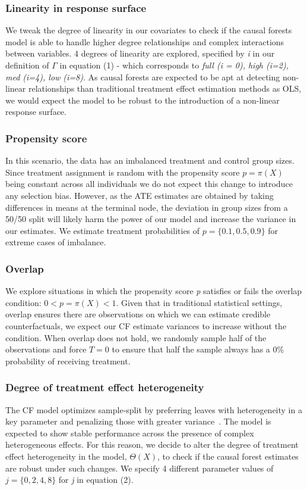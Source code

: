 \documentclass[12pt]{article}
\begin{document}
\subsubsection{Linearity in response surface} 
We tweak the degree of linearity in our covariates to check if the causal
forests model is able to handle higher degree relationships and complex
interactions between variables. 4 degrees of linearity are explored, specified
by \textit{i} in our definition of $\Gamma$ in equation (1) - which corresponds
to \textit{full (i = 0), high (i=2), med (i=4), low (i=8)}. As causal forests
are expected to be apt at detecting non-linear relationships than traditional
treatment effect estimation methods as OLS, we would expect the model to be
robust to the introduction of a non-linear response surface. 

\subsubsection{Propensity score} 
In this scenario, the data has an imbalanced treatment and control group sizes.
Since treatment assignment is random with the propensity score $p = \pi(X)$
being constant across all individuals we do not expect this change to introduce
any selection bias. However, as the ATE estimates are obtained by taking
differences in means at the terminal node, the deviation in group sizes from a
50/50 split will likely harm the power of our model and increase the variance in
our estimates. We estimate treatment probabilities of $p = \{0.1, 0.5, 0.9\}$
for extreme cases of imbalance. 

\subsubsection{Overlap}
We explore situations in which the propensity score \textit{p} satisfies or
fails the overlap condition: $0 < p = \pi(X) < 1$. Given that in traditional
statistical settings, overlap ensures there are observations on which we can
estimate credible counterfactuals, we expect our CF estimate variances to
increase without the condition. When overlap does not hold, we randomly sample
half of the observations and force $T = 0$ to ensure that half the sample always
has a 0\% probability of receiving treatment. 

\subsubsection{Degree of treatment effect heterogeneity} 
The CF model optimizes sample-split by preferring leaves with heterogeneity in
a key parameter and penalizing those with greater variance~\cite{athey2018grf}.
The model is expected to show stable performance across the presence of complex
heterogeneous effects. For this reason, we decide to alter the degree of
treatment effect heterogeneity in the model, $\Theta(X)$, to check if the causal
forest estimates are robust under such changes. We specify 4 different parameter
values of $j = \{0,2,4,8\}$ for \textit{j} in equation (2). 
\end{document}
